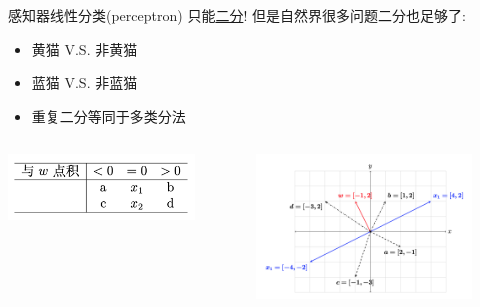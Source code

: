\documentclass[handout]{ctexbeamer}
\begin{document}
\begin{frame}{感知器线性分类(perceptron)}
只能\underline{二分}! 但是自然界很多问题二分也足够了:
\begin{itemize}
	\item 黄猫 V.S. 非黄猫
	\item 蓝猫 V.S. 非蓝猫
	\item 重复二分等同于多类分法
\end{itemize}
\begin{columns}
\begin{column}{0.3\textwidth}
\centering
\includegraphics[width=\textwidth]{fig/P2dotpTable}
\end{column}
\begin{column}{0.7\textwidth}
	\begin{figure}[H]
	\centering
	\includegraphics[width=\textwidth]{fig/C2C2dotprodt}
\end{figure}	
\end{column}
\end{columns}
\end{frame}
\end{document}
